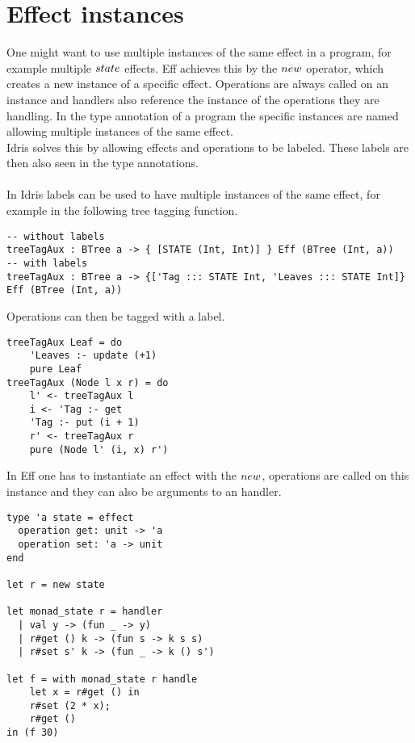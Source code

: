\section{Effect instances}
One might want to use multiple instances of the same effect in a program, for example multiple $\mathnormal{state}$ effects. Eff achieves this by the $\mathnormal{new}$ operator, which creates a new instance of a specific effect. Operations are always called on an instance and handlers also reference the instance of the operations they are handling. In the type annotation of a program the specific instances are named allowing multiple instances of the same effect. \\
Idris solves this by allowing effects and operations to be labeled. These labels are then also seen in the type annotations.
\\\\
In Idris labels can be used to have multiple instances of the same effect, for example in the following tree tagging function.
\begin{lstlisting}
-- without labels
treeTagAux : BTree a -> { [STATE (Int, Int)] } Eff (BTree (Int, a))
-- with labels
treeTagAux : BTree a -> {['Tag ::: STATE Int, 'Leaves ::: STATE Int]} Eff (BTree (Int, a))
\end{lstlisting}
\newpage
Operations can then be tagged with a label.
\begin{lstlisting}
treeTagAux Leaf = do
	'Leaves :- update (+1)
	pure Leaf
treeTagAux (Node l x r) = do
	l' <- treeTagAux l
	i <- 'Tag :- get
	'Tag :- put (i + 1)
	r' <- treeTagAux r
	pure (Node l' (i, x) r')
\end{lstlisting}

In Eff one has to instantiate an effect with the $\mathnormal{new}$, operations are called on this instance and they can also be arguments to an handler.
\begin{lstlisting}
type 'a state = effect
  operation get: unit -> 'a
  operation set: 'a -> unit
end

let r = new state

let monad_state r = handler
  | val y -> (fun _ -> y)
  | r#get () k -> (fun s -> k s s)
  | r#set s' k -> (fun _ -> k () s')

let f = with monad_state r handle
    let x = r#get () in
    r#set (2 * x);
    r#get ()
in (f 30)
\end{lstlisting}

